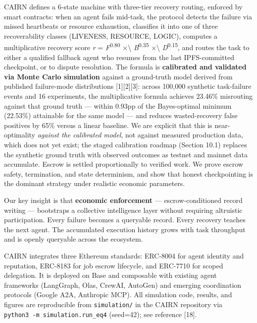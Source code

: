\documentclass[
  10pt,
]{article}
\begin{document}
CAIRN defines a 6-state machine with three-tier recovery routing,
enforced by smart contracts: when an agent fails mid-task, the protocol
detects the failure via missed heartbeats or resource exhaustion,
classifies it into one of three recoverability classes (LIVENESS,
RESOURCE, LOGIC), computes a multiplicative recovery score \emph{r} =
\emph{F}\textsuperscript{0.80} ×\textbackslash{}
\emph{B}\textsuperscript{0.35} ×\textbackslash{}
\emph{D}\textsuperscript{0.15}, and routes the task to either a
qualified fallback agent who resumes from the last IPFS-committed
checkpoint, or to dispute resolution. The formula is \textbf{calibrated
and validated via Monte Carlo simulation} against a ground-truth model
derived from published failure-mode distributions {[}1{]}{[}2{]}{[}3{]}:
across 100,000 synthetic task-failure events and 16 experiments, the
multiplicative formula achieves 23.46\% misrouting against that ground
truth --- within 0.93pp of the Bayes-optimal minimum (22.53\%)
attainable for the same model --- and reduces wasted-recovery false
positives by 65\% versus a linear baseline. We are explicit that this is
near-optimality \emph{against the calibrated model}, not against
measured production data, which does not yet exist; the staged
calibration roadmap (Section 10.1) replaces the synthetic ground truth
with observed outcomes as testnet and mainnet data accumulate. Escrow is
settled proportionally to verified work. We prove escrow safety,
termination, and state determinism, and show that honest checkpointing
is the dominant strategy under realistic economic parameters.

Our key insight is that \textbf{economic enforcement} ---
escrow-conditioned record writing --- bootstraps a collective
intelligence layer without requiring altruistic participation. Every
failure becomes a queryable record. Every recovery teaches the next
agent. The accumulated execution history grows with task throughput and
is openly queryable across the ecosystem.

CAIRN integrates three Ethereum standards: ERC-8004 for agent identity
and reputation, ERC-8183 for job escrow lifecycle, and ERC-7710 for
scoped delegation. It is deployed on Base and composable with existing
agent frameworks (LangGraph, Olas, CrewAI, AutoGen) and emerging
coordination protocols (Google A2A, Anthropic MCP). All simulation code,
results, and figures are reproducible from \texttt{simulation/} in the
CAIRN repository via \texttt{python3\ -m\ simulation.run\_eq4}
(seed=42); see reference {[}18{]}.
\end{document}
